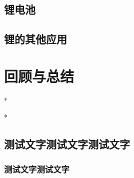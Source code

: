 \documentclass[color=BLUE]{textbook-cn}%
\begin{document}
\subsection{锂电池}
\lipsum[1-2]
\subsection{锂的其他应用}
\lipsum[1-2]

\begin{Exercise}
\begin{QsNum}
\item \lipsum[1][1-2]
\item \lipsum[1][1-2]
\item \lipsum[1][1-2]
\item \lipsum[1][1-2]
\item \lipsum[1][1-2]
\item \lipsum[1][1-2]
\item \lipsum[1][1-2]
\item \lipsum[1][1-2]
\end{QsNum}
\tcblower
\lipsum[1]
\end{Exercise}


\section{回顾与总结}

\begin{Point}*
\lipsum[2]
\end{Point}

\begin{Case}*
\item \lipsum[1][1]
\item \lipsum[1][1]
\item \lipsum[1][1]
\end{Case}

\subsection{测试文字测试文字测试文字}


\subsubsection*{测试文字测试文字}
\lipsum[1-2]

\Example{\lipsum[1][1-5]}
\Answer{\lipsum[1][1-4]}
\Answer*{\lipsum[1][1-4]}

\Variety{\lipsum[1][1-5]}
\Answer{\lipsum[1][1-4]}
\Answer*{\lipsum[1][1-4]}
\end{document}
